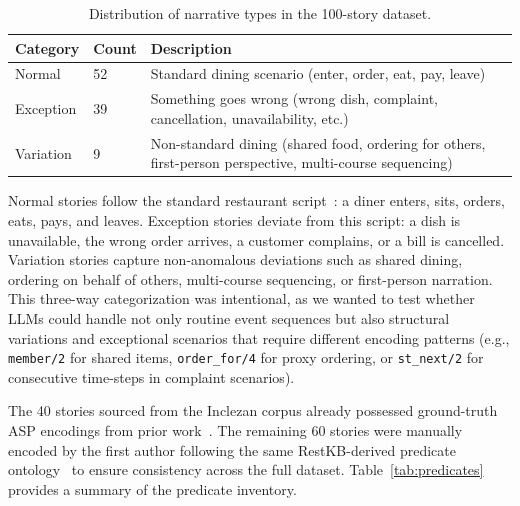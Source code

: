 \documentclass[runningheads]{llncs}
\begin{document}
\begin{table}[t]
\centering
\small
\caption{Distribution of narrative types in the 100-story dataset.}
\label{tab:scenario-types}
\begin{tabular}{@{}lp{2.8cm}p{7.5cm}@{}}
\toprule
\textbf{Category} & \textbf{Count} & \textbf{Description} \\
\midrule
Normal     & 52 & Standard dining scenario (enter, order, eat, pay, leave) \\
Exception  & 39 & Something goes wrong (wrong dish, complaint,
                   cancellation, unavailability, etc.) \\
Variation  &  9 & Non-standard dining (shared food, ordering for others,
                   first-person perspective, multi-course sequencing) \\
\bottomrule
\end{tabular}
\end{table}

Normal stories follow the standard restaurant script~\cite{Schank1978ScriptsPG,mueller04}:
a diner enters, sits, orders, eats, pays, and leaves.  Exception stories
deviate from this script: a dish is unavailable, the wrong order arrives, a
customer complains, or a bill is cancelled.  Variation stories capture
non-anomalous deviations such as shared dining, ordering on behalf of others,
multi-course sequencing, or first-person narration.  This three-way
categorization was intentional, as we wanted to test whether LLMs could handle
not only routine event sequences but also structural variations and
exceptional scenarios that require different encoding patterns (e.g.,
\texttt{member/2} for shared items, \texttt{order\_for/4} for proxy ordering,
or \texttt{st\_next/2} for consecutive time-steps in complaint scenarios).

The 40 stories sourced from the Inclezan corpus already possessed ground-truth
ASP encodings from prior work~\cite{ZHANG_2019,Inclezan2017UnderstandingRS}.
The remaining 60 stories were manually encoded by the first author following
the same RestKB-derived predicate ontology~\cite{inclezan2019restkb} to ensure
consistency across the full dataset.
Table~\ref{tab:predicates} provides a summary of the predicate inventory.
\end{document}
